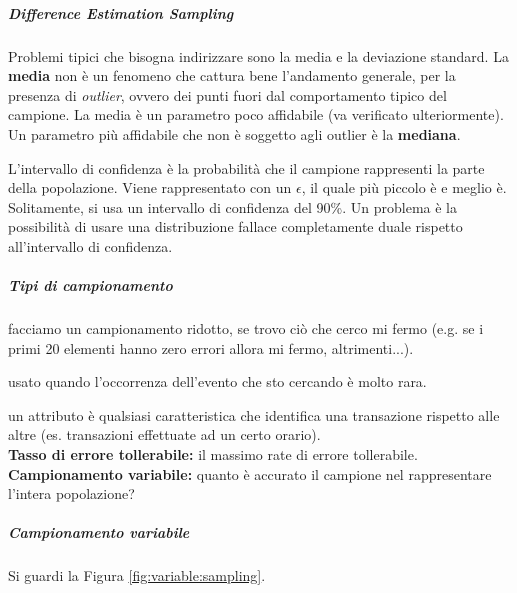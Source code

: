 \subparagraph*{Difference Estimation Sampling}

Problemi tipici che bisogna indirizzare sono la media e la deviazione standard.
La \textbf{media} non è un fenomeno che cattura bene l'andamento generale, per la
presenza di \textit{outlier}, ovvero dei punti fuori dal comportamento
tipico del campione.
La media è un parametro poco affidabile (va verificato ulteriormente). Un
parametro più affidabile che non è soggetto agli
outlier è la \textbf{mediana}.

L'intervallo di confidenza è la probabilità che il campione rappresenti la parte
della popolazione. Viene rappresentato con un $\epsilon$, il quale più piccolo è e
meglio è. Solitamente, si usa un intervallo di confidenza del 90\%. Un problema
è la possibilità di usare una distribuzione fallace completamente duale rispetto
all'intervallo di confidenza.


\subparagraph*{Tipi di campionamento}

 facciamo un campionamento ridotto, se trovo
ciò che cerco mi fermo (e.g. se i primi 20 elementi hanno zero errori allora mi fermo,
altrimenti...).

 usato quando l'occorrenza dell'evento che
sto cercando è molto rara.

 un attributo è qualsiasi
caratteristica che identifica una transazione rispetto alle altre (es.
transazioni effettuate ad un certo orario).\\
\newline
\textbf{Tasso di errore tollerabile:} il massimo rate di errore
tollerabile.\\
\newline
\textbf{Campionamento variabile:} quanto è accurato il campione nel rappresentare
l'intera popolazione?


\subparagraph{Campionamento variabile}

Si guardi la Figura \ref{fig:variable:sampling}.

